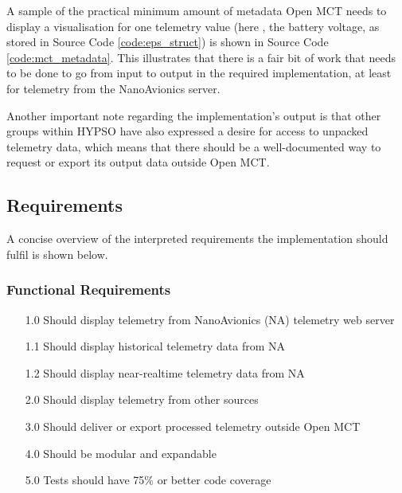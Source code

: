 \begin{code}
\inputminted[linenos=true,breaklines=true,bgcolor=codebg]{javascript}{./Code/telemetry_metadata_sample.json}
\label{code:mct_metadata}
\end{code}

A sample of the practical minimum amount of \gls{metadata} Open MCT needs to display a visualisation for one telemetry value (here , the battery voltage, as stored in Source Code \ref{code:eps_struct}) is shown in Source Code \ref{code:mct_metadata}. This illustrates that there is a fair bit of work that needs to be done to go from input to output in the required implementation, at least for telemetry from the NanoAvionics server.

Another important note regarding the implementation's output is that other groups within HYPSO have also expressed a desire for access to unpacked telemetry data, which means that there should be a well-documented way to request or export its output data outside Open MCT.

\subsection{Requirements}
A concise overview of the interpreted requirements the implementation should fulfil is shown below.

\subsubsection{Functional Requirements}
\begin{enumerate}
  \item[1.0] Should display telemetry from NanoAvionics (NA) telemetry web server
  \item[1.1] Should display historical telemetry data from NA
  \item[1.2] Should display near-realtime telemetry data from NA
  \item[2.0] Should display telemetry from other sources
  \item[3.0] Should deliver or export processed telemetry outside Open MCT
  \item[4.0] Should be modular and expandable
  \item[5.0] Tests should have 75\% or better code coverage
\end{enumerate}

